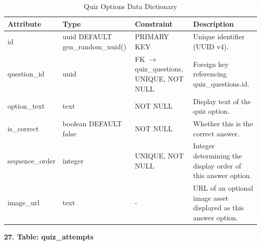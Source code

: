 \documentclass[12pt, oneside]{article} %
\newcommand{\tabbreak}{\hyphenpenalty=200\exhyphenpenalty=200\tolerance=4000\hbadness=10000\hspace{0pt}}
\begin{document}
\begin{table}[H]
\caption{Quiz Options Data Dictionary}
\label{tab:dd_quiz_options}
\vspace{-4mm}
\begin{center}
\renewcommand{\arraystretch}{1.15}
\scriptsize
\begin{tabular}{|>{\raggedright\arraybackslash\tabbreak}p{2.67cm}|>{\raggedright\arraybackslash\tabbreak}p{2.93cm}|>{\raggedright\arraybackslash\tabbreak}p{2.67cm}|>{\raggedright\arraybackslash\tabbreak}p{4.51cm}|}
\hline
\textbf{Attribute} & \textbf{Type} & \textbf{Constraint} & \textbf{Description} \\ \hline
id & uuid DEFAULT gen\_random\_uuid() & PRIMARY KEY & Unique identifier (UUID v4). \\ \hline
question\_id & uuid & FK $\rightarrow$ quiz\_questions, UNIQUE, NOT NULL & Foreign key referencing quiz\_questions.id. \\ \hline
option\_text & text & NOT NULL & Display text of the quiz option. \\ \hline
is\_correct & boolean DEFAULT false & NOT NULL & Whether this is the correct answer. \\ \hline
sequence\_order & integer & UNIQUE, NOT NULL & Integer determining the display order of this answer option. \\ \hline
image\_url & text & - & URL of an optional image asset displayed as this answer option. \\ \hline
\end{tabular}
\end{center}
\end{table}

\textbf{27. Table: quiz\_attempts}
\end{document}
